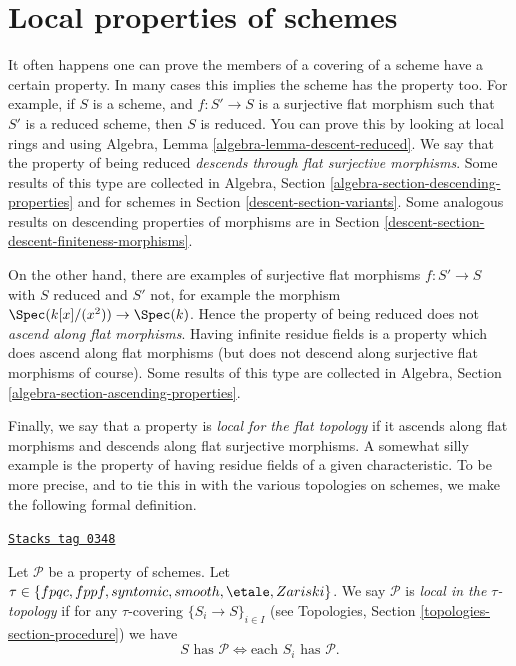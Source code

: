 \section{Local properties of schemes}
\label{descent-section-descending-properties}
It often happens one can prove the members of a covering of a scheme
have a certain property. In many cases this implies the scheme has the
property too. For example, if $S$ is a scheme, and $f : S' \to S$
is a surjective flat morphism such that $S'$ is a reduced scheme, then $S$ is
reduced. You can prove this by looking at local rings and using
Algebra, Lemma \ref{algebra-lemma-descent-reduced}.
We say that the property of being reduced
{\it descends through flat surjective morphisms}.
Some results of this type are collected in
Algebra, Section \ref{algebra-section-descending-properties} and
for schemes in Section \ref{descent-section-variants}.
Some analogous results on descending properties
of morphisms are in Section \ref{descent-section-descent-finiteness-morphisms}.

\medskip\noindent
On the other hand, there are examples of surjective flat morphisms
$f : S' \to S$ with $S$ reduced and $S'$ not, for example the morphism
$\Spec(k[x]/(x^2)) \to \Spec(k)$. Hence the property of
being reduced does not {\it ascend along flat morphisms}. Having infinite
residue fields is a property which does ascend along flat morphisms (but
does not descend along surjective flat morphisms of course). Some results
of this type are collected in
Algebra, Section \ref{algebra-section-ascending-properties}.

\medskip\noindent
Finally, we say that a property is {\it local for the flat topology}
if it ascends along flat morphisms and descends along flat surjective
morphisms. A somewhat silly example is the property of having residue
fields of a given characteristic. To be more precise, and to tie this in
with the various topologies on schemes, we make the following
formal definition.

\begin{definition}
\label{descent-definition-property-local}
\href{https://stacks.math.columbia.edu/tag/0348}{\texttt{Stacks tag 0348}}

Let $\mathcal{P}$ be a property of schemes. Let
$\tau \in \{fpqc, \linebreak[0] fppf, \linebreak[0] syntomic, \linebreak[0]
smooth, \linebreak[0] \etale, \linebreak[0] Zariski\}$.
We say $\mathcal{P}$ is {\it local in the $\tau$-topology} if for any
$\tau$-covering $\{S_i \to S\}_{i \in I}$ (see
Topologies, Section \ref{topologies-section-procedure})
we have
$$
S \text{ has }\mathcal{P}
\Leftrightarrow
\text{each }S_i \text{ has }\mathcal{P}.
$$
\end{definition}

